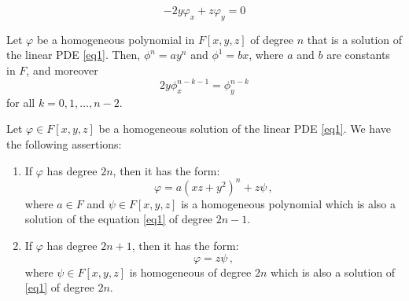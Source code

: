 \documentclass[10pt,a4paper]{amsart}
\begin{document}
	\begin{equation}\label{eq1}
		-2y\varphi_x+z\varphi_y=0
	\end{equation}

\begin{lem}\label{psedp}
	Let $\varphi$ be a homogeneous polynomial in $F[x,y,z]$ of degree $n$ that is a solution of the linear PDE \eqref{eq1}. Then, $\phi^{n}=ay^{n}$ and $\phi^{1}=bx$, where $a$ and $b$ are constants in $F$, and moreover
	$$2y\phi^{n-k-1}_x=\phi^{n-k}_y$$
	for all $k=0,1,\dots, n-2$.
\end{lem}

\begin{prop}\label{pr1}
	Let $\varphi\in F[x,y,z]$ be a homogeneous solution of the linear PDE \eqref{eq1}. 
	We have the following assertions:
	\begin{enumerate}
		\item[ ($a$)] If $\varphi$ has degree $2n$, then it has the form: 
		\begin{equation*}
			\varphi=a(xz+y^2)^n+z\psi\,,
		\end{equation*}
		where $a\in F$ and $\psi\in F[x,y,z]$ is a homogeneous polynomial which is also a solution of the equation \eqref{eq1} of degree $2n-1$.
		\item[($b$)] If $\varphi$ has degree $2n+1$,  then it has the form: 
		\begin{equation*}
			\varphi=z\psi\,,
		\end{equation*}
		where $\psi\in F[x,y,z]$ is homogeneous of degree $2n$ which is also a solution of \eqref{eq1} of degree $2n$.
	\end{enumerate}
	
\end{prop}
\end{document}
